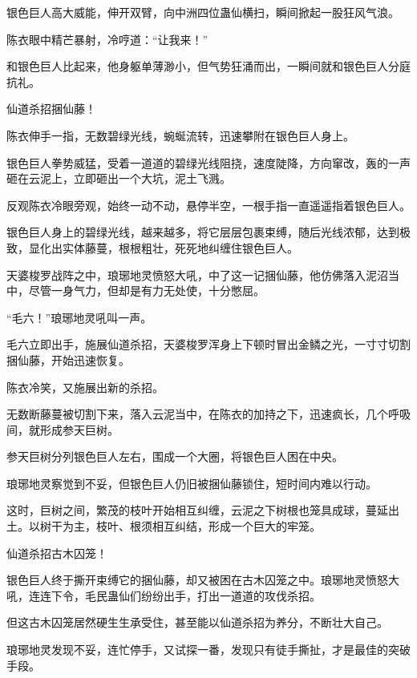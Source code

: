 
\begin{this_body}



银色巨人高大威能，伸开双臂，向中洲四位蛊仙横扫，瞬间掀起一股狂风气浪。

陈衣眼中精芒暴射，冷哼道：“让我来！”

和银色巨人比起来，他身躯单薄渺小，但气势狂涌而出，一瞬间就和银色巨人分庭抗礼。

仙道杀招捆仙藤！

陈衣伸手一指，无数碧绿光线，蜿蜒流转，迅速攀附在银色巨人身上。

银色巨人拳势威猛，受着一道道的碧绿光线阻挠，速度陡降，方向窜改，轰的一声砸在云泥上，立即砸出一个大坑，泥土飞溅。

反观陈衣冷眼旁观，始终一动不动，悬停半空，一根手指一直遥遥指着银色巨人。

银色巨人身上的碧绿光线，越来越多，将它层层包裹束缚，随后光线浓郁，达到极致，显化出实体藤蔓，根根粗壮，死死地纠缠住银色巨人。

天婆梭罗战阵之中，琅琊地灵愤怒大吼，中了这一记捆仙藤，他仿佛落入泥沼当中，尽管一身气力，但却是有力无处使，十分憋屈。

“毛六！”琅琊地灵吼叫一声。

毛六立即出手，施展仙道杀招，天婆梭罗浑身上下顿时冒出金鳞之光，一寸寸切割捆仙藤，开始迅速恢复。

陈衣冷笑，又施展出新的杀招。

无数断藤蔓被切割下来，落入云泥当中，在陈衣的加持之下，迅速疯长，几个呼吸间，就形成参天巨树。

参天巨树分列银色巨人左右，围成一个大圈，将银色巨人困在中央。

琅琊地灵察觉到不妥，但银色巨人仍旧被捆仙藤锁住，短时间内难以行动。

这时，巨树之间，繁茂的枝叶开始相互纠缠，云泥之下树根也笼具成球，蔓延出土。以树干为主，枝叶、根须相互纠结，形成一个巨大的牢笼。

仙道杀招古木囚笼！

银色巨人终于撕开束缚它的捆仙藤，却又被困在古木囚笼之中。琅琊地灵愤怒大吼，连连下令，毛民蛊仙们纷纷出手，打出一道道的攻伐杀招。

但这古木囚笼居然硬生生承受住，甚至能以仙道杀招为养分，不断壮大自己。

琅琊地灵发现不妥，连忙停手，又试探一番，发现只有徒手撕扯，才是最佳的突破手段。


\end{this_body}
